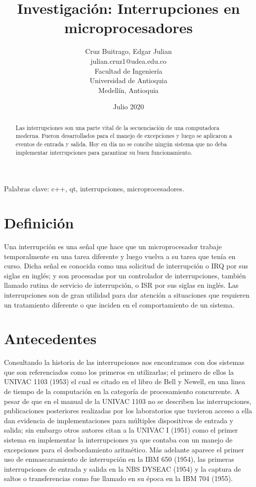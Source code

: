 \documentclass[]{article}
\title{Investigación: Interrupciones en microprocesadores}
\author{Cruz Buitrago, Edgar Julian \\ julian.cruz1@udea.edu.co \\ Facultad de Ingeniería \\ Universidad de Antioquia \\ Medellín, Antioquia}
\date{Julio 2020}
\begin{document}
	
	\maketitle
	\begin{multicols}{2}
		\justify
		\begin{abstract}		
			Las interrupciones son una parte vital de la secuenciación de una computadora moderna. Fueron desarrollados para el manejo de excepciones y luego se aplicaron a eventos de entrada y salida. Hoy en día no se concibe ningún sistema que no deba implementar interrupciones para garantizar su buen funcionamiento.
		\end{abstract}
		{\smallskip \keywords Palabras clave: c++, qt, interrupciones, microprocesadores.}
		\section{Definición}
		Una interrupción es una señal que hace que un microprocesador trabaje temporalmente en una tarea diferente y luego vuelva a su tarea que tenía en curso.\cite{wikibooks}  Dicha señal es conocida como una solicitud de interrupción o IRQ por sus siglas en inglés; y son procesadas por un controlador de interrupciones, también llamado rutina de servicio de interrupción, o ISR por sus siglas en inglés.\cite{techterms}  Las interrupciones son de gran utilidad para dar atención a situaciones que requieren un tratamiento diferente o que inciden en el comportamiento de un sistema.
		\section{Antecedentes}
		Consultando la historia de las interrupciones nos encontramos con dos sistemas que son referenciados como los primeros en utilizarlas; el primero de ellos la UNIVAC 1103 (1953) el cual es citado en el libro de Bell y Newell, en una linea de tiempo de la computación en la categoría de procesamiento concurrente\cite{history2}.  A pesar de que en el manual de la UNIVAC 1103\cite{history3} no se describen las interrupciones, publicaciones posteriores realizadas por los laboratorios que tuvieron acceso a ella dan evidencia de implementaciones para múltiples dispositivos de entrada y salida; sin embargo otros autores citan a la UNIVAC I (1951) como el primer sistema en implementar la interrupciones ya que contaba con un manejo de excepciones para el desbordamiento aritmético.  Más adelante aparece el primer uso de enmascaramiento de interrupción en la IBM 650 (1954), las primeras interrupciones de entrada y salida en la NBS DYSEAC (1954) y la captura de saltos o transferencias como fue llamado en su época en la IBM 704 (1955).\cite{history}

\end{multicols}
\end{document}

